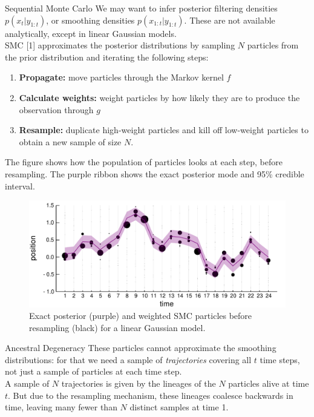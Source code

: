 \documentclass[final, 12pt]{beamer}
\newlength{\colwidth}
\begin{document}
\begin{frame}
\begin{columns}
\begin{column}{\colwidth}
\begin{block}{Sequential Monte Carlo}
We may want to infer posterior filtering densities $p(x_t | y_{1:t})$, or smoothing densities $p(x_{1:t} | y_{1:t})$. 
These are not available analytically, except in linear Gaussian models. \\[12pt]

SMC [1] approximates the posterior distributions by sampling $N$ particles from the prior distribution and iterating the following steps:
\begin{enumerate}
\item \textbf{Propagate:} move particles through the Markov kernel $f$
\item \textbf{Calculate weights:} weight particles by how likely they are to produce the observation through $g$
\item \textbf{Resample:} duplicate high-weight particles and kill off low-weight particles to obtain a new sample of size $N$.
\end{enumerate}

\vspace*{10pt}

The figure shows how the population of particles looks at each step, before resampling. The purple ribbon shows the exact posterior mode and 95\% credible interval.
\begin{figure}
\includegraphics[width=\colwidth]{smc_kalman_3.pdf}
\caption{Exact posterior (purple) and weighted SMC particles before resampling (black) for a linear Gaussian model.}
\end{figure}
\end{block}

\begin{block}{Ancestral Degeneracy}
These particles cannot approximate the smoothing distributions: for that we need a sample of \emph{trajectories} covering all $t$ time steps, not just a sample of particles at each time step.\\[10pt]

A sample of $N$ trajectories is given by the lineages of the $N$ particles alive at time $t$.
But due to the resampling mechanism, these lineages coalesce backwards in time, leaving many fewer than $N$ distinct samples at time 1. 


\end{block}
\end{column}
\end{columns}
\end{frame}
\end{document}
